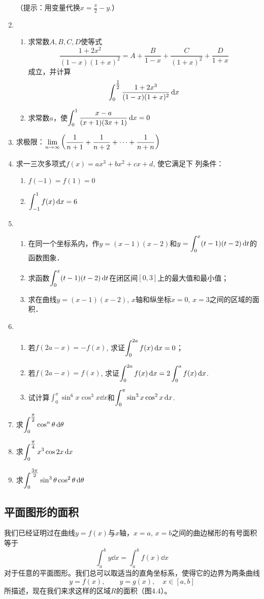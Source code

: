 \begin{ex}
\begin{enumerate}
（提示：用变量代换$x=\frac{\pi}{2}-y$.）
\item \begin{enumerate}
    \item 求常数$A,B,C,D$使等式$$\frac{1+2x^2}{(1-x)(1+x)^2}=A+\frac{B}{1-x}+\frac{C}{(1+x)^2}+\frac{D}{1+x}$$成立，并计算$$\displaystyle\int^{\tfrac{1}{2}}_0 \dfrac{1+2x^3}{(1-x)(1+x)^2}\,{\rm d} x$$
    \item 求常数$a$，使$\displaystyle\int^1_0 \dfrac{x-a}{(x+1)(3x+1)}\,{\rm d} x=0$
\end{enumerate}
\item 求极限：$\displaystyle\lim_{n\to\infty}\left(\dfrac{1}{n+1}+\dfrac{1}{n+2}+\cdots +\dfrac{1}{n+n}\right)$
\item 求一三次多项式$f(x)=ax^3+bx^2+cx+d$, 使它满足下
列条件：
\begin{enumerate}
    \item $f (-1) =f (1) =0$
    \item $\displaystyle\int^1_{-1} f(x)\,{\rm d} x=6$
\end{enumerate}
\item 
\begin{enumerate}
\item 在同一个坐标系内，作$y=(x-1)(x-2)$和$y=\displaystyle\int^x_0 (t-1)(t-2)\,{\rm d} t$的函数图象．
\item 求函数$\displaystyle\int^x_0 (t-1)(t-2)\,{\rm d} t$在闭区间$[0, 3]$上的最大值和最小值；
\item 求在曲线$y=(x-1)(x-2)$, $x$轴和纵坐标$x=0$, $x=3$之间的区域的面积．
\end{enumerate}
\item 
\begin{enumerate}
    \item 若$f(2a-x)=-f(x)$, 求证$\displaystyle\int^{2a}_0 f (x) \,{\rm d} x=0$；
\item 
若$f(2a-x)=f(x)$, 求证$\displaystyle\int^{2a}_0 f (x) \,{\rm d} x=2\int^a_0 f (x) \,{\rm d} x$. 
\item 试计算$\int^{\pi}_0 \sin^6 x\cos^3x\dd x$和$\displaystyle\int^{\pi}_0 \sin^3x \cos^2 x\,{\rm d} x$.
\end{enumerate}

\item 求$\displaystyle\int^{\tfrac{\pi}{2}}_0 \cos^n \theta\,{\rm d} \theta$
\item 求$\displaystyle\int^{\tfrac{\pi}{4}}_0 x^3\cos2x\,{\rm d} x$
\item 求$\displaystyle\int^{\tfrac{3\pi}{2}}_0 \sin^3\theta \cos^2 \theta\,{\rm d} \theta$
\end{enumerate} 
\end{ex}

\subsection{平面图形的面积}
我们已经证明过在曲线$y=f(x)$与$x$轴，$x=a$, $x=b$之间的曲边梯形的有号面积等于
\[\int^b_a y\dd x=\int^b_a f(x)\dd x\]
对于任意的平面图形。我们总可以取适当的直角坐标系，使得它的边界为两条曲线
\[y=f (x) ,\qquad  y=g (x) ,\quad x\in [a,b]\]
所描述，现在我们来求这样的区域$R$的面积（图4.4）。

